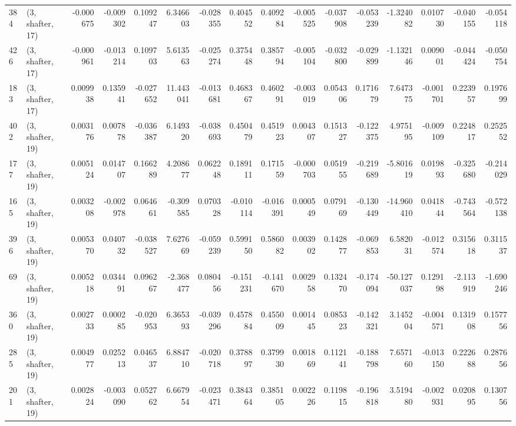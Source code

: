 \begin{tabular}{llrrrrrrrrrrrrrr}
384 &  (3, shafter, 17) &  -0.000675 & -0.009302 &  0.109247 &     6.346603 &  -0.028355 &   0.404552 &   0.409284 & -0.005525 & -0.037908 & -0.053239 &   -1.324082 &  0.010730 & -0.040155 & -0.054118 \\
426 &  (3, shafter, 17) &  -0.000961 & -0.013214 &  0.109703 &     5.613563 &  -0.025274 &   0.375448 &   0.385794 & -0.005104 & -0.032800 & -0.029899 &   -1.132146 &  0.009001 & -0.044424 & -0.050754 \\
183 &  (3, shafter, 17) &   0.009938 &  0.135941 & -0.027652 &    11.443041 &  -0.013681 &   0.468367 &   0.460291 & -0.003019 &  0.054306 &  0.171679 &    7.647375 & -0.001701 &  0.223957 &  0.197699 \\
402 &  (3, shafter, 19) &   0.003176 &  0.007878 & -0.036387 &     6.149320 &  -0.038693 &   0.450479 &   0.451923 &  0.004307 &  0.151327 & -0.122375 &    4.975195 & -0.009109 &  0.224817 &  0.252552 \\
177 &  (3, shafter, 19) &   0.005124 &  0.014707 &  0.166289 &     4.208677 &   0.062248 &   0.189111 &   0.171559 & -0.000703 &  0.051955 & -0.219689 &   -5.801619 &  0.019893 & -0.325680 & -0.214029 \\
165 &  (3, shafter, 19) &   0.003208 & -0.002978 &  0.064661 &    -0.309585 &   0.070328 &  -0.010114 &  -0.016391 &  0.000549 &  0.079169 & -0.130449 &  -14.960410 &  0.041844 & -0.743564 & -0.572138 \\
396 &  (3, shafter, 19) &   0.005370 &  0.040732 & -0.038527 &     7.627669 &  -0.059239 &   0.599150 &   0.586082 &  0.003902 &  0.142877 & -0.069853 &    6.582031 & -0.012574 &  0.315618 &  0.311537 \\
69  &  (3, shafter, 19) &   0.005218 &  0.034491 &  0.096267 &    -2.368477 &   0.080456 &  -0.151231 &  -0.141670 &  0.002958 &  0.132470 & -0.174094 &  -50.127037 &  0.129198 & -2.113919 & -1.690246 \\
360 &  (3, shafter, 19) &   0.002733 &  0.000285 & -0.020953 &     6.365393 &  -0.039296 &   0.457884 &   0.455009 &  0.001445 &  0.085323 & -0.142321 &    3.145204 & -0.004571 &  0.131908 &  0.157756 \\
285 &  (3, shafter, 19) &   0.004977 &  0.025213 &  0.046537 &     6.884710 &  -0.020718 &   0.378897 &   0.379930 &  0.001869 &  0.112141 & -0.188798 &    7.657160 & -0.013150 &  0.222688 &  0.287656 \\
201 &  (3, shafter, 19) &   0.002824 & -0.003090 &  0.052762 &     6.667954 &  -0.023471 &   0.384364 &   0.385105 &  0.002226 &  0.119815 & -0.196818 &    3.519480 & -0.002931 &  0.020895 &  0.130756 \\

\end{tabular}

